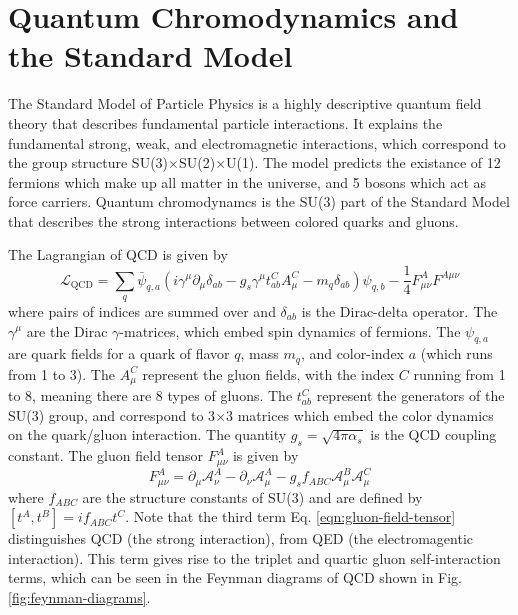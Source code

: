 
\section{Quantum Chromodynamics and the Standard Model}
\label{qgp:qcd}

The Standard Model of Particle Physics is a highly descriptive quantum field theory that describes fundamental particle interactions.
It explains the fundamental strong, weak, and electromagnetic interactions, which correspond to the group structure SU(3)$\times$SU(2)$\times$U(1).
The model predicts the existance of 12 fermions which make up all matter in the universe, and 5 bosons which act as force carriers.
Quantum chromodynamcs is the SU(3) part of the Standard Model that describes the strong interactions between colored quarks and gluons.



The Lagrangian of QCD is given by
\begin{equation}
  \mathcal{L}_{\text{QCD}} = \sum_q \bar{\psi}_{q,a} \left( i\gamma^\mu \partial_\mu \delta_{ab} - g_s \gamma^\mu t_{ab}^{C} A_{\mu}^C - m_q \delta_{ab}\right)\psi_{q,b} - \frac{1}{4}F_{\mu\nu}^{A} F^{A\mu\nu}
\end{equation}
where pairs of indices are summed over and $\delta_{ab}$ is the Dirac-delta operator.
The $\gamma^\mu$ are the Dirac $\gamma$-matrices, which embed spin dynamics of fermions.
The $\psi_{q,a}$ are quark fields for a quark of flavor $q$, mass $m_q$, and color-index $a$ (which runs from 1 to 3).
The $A_\mu^C$ represent the gluon fields, with the index $C$ running from 1 to 8, meaning there are 8 types of gluons.
The $t_{ab}^C$ represent the generators of the SU(3) group, and correspond to 3$\times$3 matrices which embed the color dynamics on the quark/gluon interaction.
The quantity $g_s = \sqrt{4\pi\alpha_s}$ is the QCD coupling constant.
The gluon field tensor $F^{A}_{\mu\nu}$ is given by
\begin{equation}
  F_{\mu\nu}^A = \partial_\mu \mathcal{A}_\nu^A - \partial_\nu \mathcal{A}_\mu^A - g_s f_{ABC} \mathcal{A}_\mu^B \mathcal{A}_\mu^C
  \label{eqn:gluon-field-tensor}
\end{equation}
where $f_{ABC}$ are the structure constants of SU(3) and are defined by $[t^A,t^B] = if_{ABC}t^C$.
Note that the third term Eq. \ref{eqn:gluon-field-tensor} distinguishes QCD (the strong interaction), from QED (the electromagentic interaction).
This term gives rise to the triplet and quartic gluon self-interaction terms, which can be seen in the Feynman diagrams of QCD shown in Fig. \ref{fig:feynman-diagrams}.

